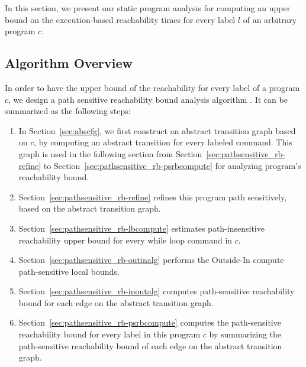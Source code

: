 In this section, we present our static program analysis for computing an upper bound on the 
execution-based reachability times for every label $l$ of an arbitrary program $c$.
%
\subsection{Algorithm Overview}
\label{sec:alg_overview}
In order to have the upper bound of the reachability for every label of a program $c$, we design 
a path sensitive reachability bound analysis algorithm {\THESYSTEM}.
It can be summarized as the following steps: 
%
%
\begin{enumerate}
\item  In Section~\ref{sec:abscfg}, we first construct an abstract transition graph based on $c$, by computing an abstract transition 
for every labeled command. 
This graph is used in the following section from Section~\ref{sec:pathsensitive_rb-refine} to Section~\ref{sec:pathsensitive_rb-psrbcompute} for analyzing program's reachability bound.
\item Section~\ref{sec:pathsensitive_rb-refine} refines this program path sensitively, based on the abstract transition graph.
\item Section~\ref{sec:pathsensitive_rb-lbcompute} estimates path-insensitive reachability upper bound for every while loop command in $c$.
\item Section~\ref{sec:pathsensitive_rb-outinalg} performs the Outside-In compute path-sensitive local bounds.
\item Section~\ref{sec:pathsensitive_rb-inoutalg} computes path-sensitive reachability bound for each edge on the abstract transition graph.
\item Section~\ref{sec:pathsensitive_rb-psrbcompute} computes the path-sensitive reachability bound for every label in this program $c$ by summarizing 
the path-sensitive reachability bound of each edge on the abstract transition graph.
\end{enumerate}

